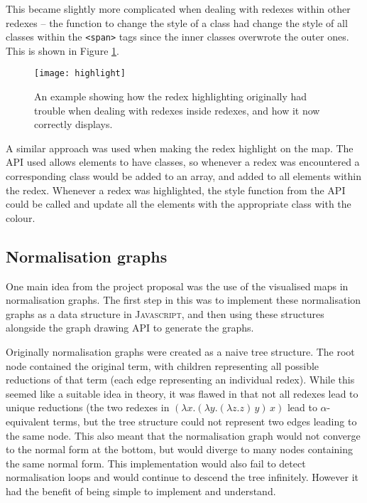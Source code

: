 \documentclass[11pt]{article}
\begin{document}
This became slightly more complicated when dealing with redexes within other redexes -- the function to change the style of a class had change the style of all classes within the \texttt{<span>} tags since the inner classes overwrote the outer ones. This is shown in Figure \ref{fig:highlight}.

\begin{figure}
    \centering
    \texttt{[image: highlight]}
    \caption{An example showing how the redex highlighting originally had trouble when dealing with redexes inside redexes, and how it now correctly displays.}
    \label{fig:highlight}
\end{figure}

A similar approach was used when making the redex highlight on the map. The API used allows elements to have classes, so whenever a redex was encountered a corresponding class would be added to an array, and added to all elements within the redex. Whenever a redex was highlighted, the style function from the API could be called and update all the elements with the appropriate class with the colour.

\subsection{Normalisation graphs}
One main idea from the project proposal was the use of the visualised maps in normalisation graphs. The first step in this was to implement these normalisation graphs as a data structure in \textsc{Javascript}, and then using these structures alongside the graph drawing API to generate the graphs.

Originally normalisation graphs were created as a naive tree structure. The root node contained the original term, with children representing all possible reductions of that term (each edge representing an individual redex). While this seemed like a suitable idea in theory, it was flawed in that not all redexes lead to unique reductions (the two redexes in $(\lambda x. (\lambda y. (\lambda z. z) \, y) \, x)$ lead to $\alpha$-equivalent terms, but the tree structure could not represent two edges leading to the same node. This also meant that the normalisation graph would not converge to the normal form at the bottom, but would diverge to many nodes containing the same normal form. This implementation would also fail to detect normalisation loops and would continue to descend the tree infinitely. However it had the benefit of being simple to implement and understand.
\end{document}
